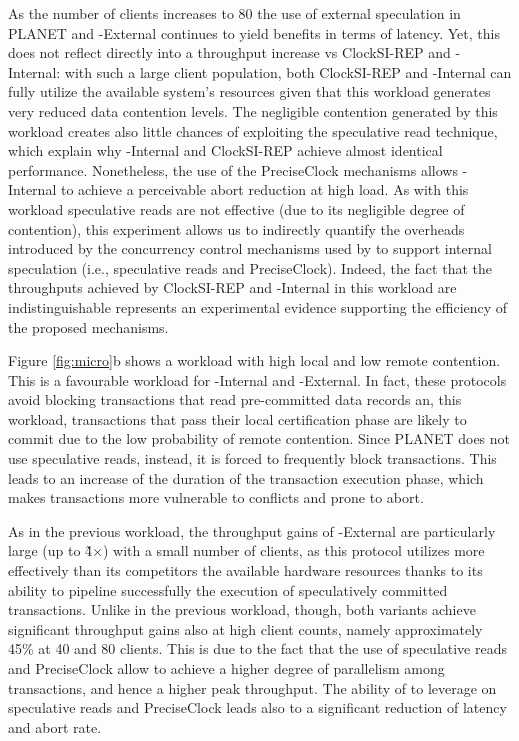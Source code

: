 As the number of clients increases to 80 the use of external speculation in PLANET and {\specula}-External  continues to yield benefits in terms of latency. Yet, this does not reflect directly into a throughput increase vs ClockSI-REP and {\specula}-Internal: with such a large client population, both ClockSI-REP and {\specula}-Internal can fully utilize the available system's resources given that this workload generates very reduced data contention levels.
The  negligible contention generated by this workload creates also little chances of exploiting the speculative read technique, which explain why  {\specula}-Internal and ClockSI-REP achieve almost identical performance. Nonetheless, the use of the PreciseClock mechanisms allows  {\specula}-Internal to achieve a perceivable abort reduction at high load. As with this workload speculative reads are not effective (due to its negligible degree of contention), this experiment allows us to indirectly quantify the overheads introduced by the concurrency control mechanisms used by \specula to support internal speculation (i.e., speculative reads and PreciseClock). Indeed, the fact that the throughputs achieved by ClockSI-REP and  {\specula}-Internal in this workload are  indistinguishable represents an experimental evidence supporting the efficiency of the proposed mechanisms.


Figure \ref{fig:micro}b shows a workload with high local and low remote contention. This is a favourable workload for {\specula}-Internal and {\specula}-External. In fact, these protocols avoid blocking transactions that read pre-committed data records an, this workload, transactions that pass their local certification phase are likely to commit due to the low probability of remote contention. Since PLANET does not use speculative reads, instead, it is forced to frequently block transactions. This leads to an increase of the duration of the transaction execution phase, which makes transactions more vulnerable to conflicts and prone to abort.

As in the previous workload, the throughput gains of  {\specula}-External are particularly large (up to \~4$\times$) with a small number of clients, as this protocol utilizes more effectively than its competitors the available hardware resources thanks to its ability to pipeline successfully the execution of speculatively committed transactions. Unlike in the previous workload, though, both 
\specula variants achieve significant throughput gains also at high client counts, namely approximately 45\% at 40 and 80 clients. This is due to the fact that the use of speculative reads and PreciseClock allow \specula to achieve a higher degree of parallelism among transactions, and hence a higher peak throughput. The ability of \specula to leverage on speculative reads and PreciseClock leads also to a significant reduction of latency and abort rate.


